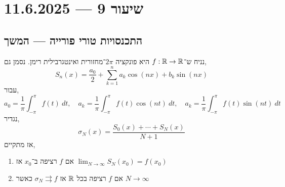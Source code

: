 \section{שיעור 9 --- 11.6.2025}

\subsection{התכנסויות טורי פורייה --- המשך}
\begin{theorem}[פייר]
	נניח ש־$f : \mathbb{R} \to \mathbb{R}$ היא פונקציה $2 \pi$־מחזורית ואינטגרבילית רימן.
	נסמן גם,
	\[
		S_n(x)
		= \frac{a_0}{2} + \sum_{k = 1}^n a_k \cos(n x) + b_k \sin(n x)
	\]
	עבור,
	\[
		a_0 = \frac{1}{\pi} \int_{-\pi}^{\pi} f(t)\ dt,
		\quad
		a_k = \frac{1}{\pi} \int_{-\pi}^{\pi} f(t) \cos(n t)\ dt,
		\quad
		a_k = \frac{1}{\pi} \int_{-\pi}^{\pi} f(t) \sin(n t)\ dt
	\]
	נגדיר,
	\[
		\sigma_N(x)
		= \frac{S_0(x) + \cdots + S_N(x)}{N + 1}
	\]
	אז מתקיים,
	\begin{enumerate}
		\item אם $f$ רציפה ב־$x_0$ אז $\lim_{N \to \infty} S_N(x_0) = f(x_0)$
		\item אם $f$ רציפה בכל $\mathbb{R}$ אז $\sigma_N \rightrightarrows f$ כאשר $N \to \infty$
	\end{enumerate}
\end{theorem}
